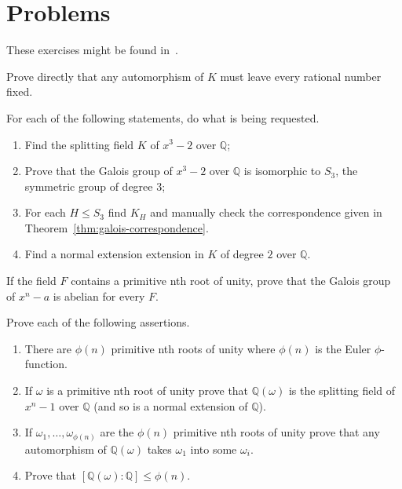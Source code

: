 \section{Problems}\label{sec:problems}

These exercises might be found in~\cite{herstein_topics_2010}.

\begin{problem}
Prove directly that any automorphism of $K$ must leave every rational number
fixed.
\end{problem}

\begin{problem}
For each of the following statements, do what is being requested.
\begin{enumerate}
	\item Find the splitting field $K$ of $x^{3}-2$ over $\mathbb{Q}$;
	\item Prove that the Galois group of $x^{3}-2$ over $\mathbb{Q}$ is
	      isomorphic to $S_{3}$, the symmetric group of degree $3$;
	\item For each ${H}\leqslant{S_{3}}$ find $K_{H}$ and manually check the
	      correspondence given in Theorem~\ref{thm:galois-correspondence}.
	\item Find a normal extension extension in $K$ of degree $2$ over
	      $\mathbb{Q}$.
\end{enumerate}
\end{problem}

\begin{problem}
If the field $F$ contains a primitive nth root of unity, prove that the
Galois group of $x^{n}-a$ is abelian for every $F$.
\end{problem}

\begin{problem}\label{problem:13}
Prove each of the following assertions.
\begin{enumerate}
	\item There are $\phi(n)$ primitive nth roots of unity where $\phi(n)$ is the
	      Euler $\phi$-function.
	\item If $\omega$ is a primitive nth root of unity prove that
	      $\mathbb{Q}(\omega)$ is the splitting field of $x^{n}-1$ over
	      $\mathbb{Q}$ (and so is a normal extension of $\mathbb{Q}$).
	\item If $\omega_{1},\ldots,\omega_{\phi(n)}$ are the $\phi(n)$ primitive nth
	      roots of unity prove that any automorphism of $\mathbb{Q}(\omega)$
	      takes $\omega_{1}$ into some $\omega_{i}$.
	\item Prove that $[\mathbb{Q}(\omega):\mathbb{Q}]\leqslant\phi(n)$.
\end{enumerate}
\end{problem}

